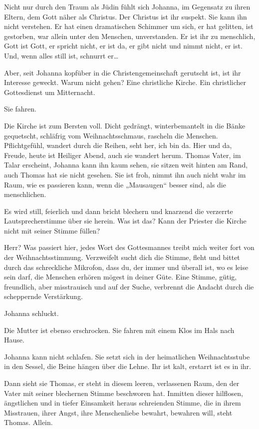 \documentclass[10pt,a5paper]{book}
\begin{document}
Nicht nur durch den Traum als Jüdin fühlt sich Johanna, im Gegensatz zu ihren Eltern, dem Gott näher als Christus. Der Christus ist ihr suspekt. Sie kann ihn nicht verstehen. Er hat einen dramatischen Schimmer um sich, er hat gelitten, ist gestorben, war allein unter den Menschen, unverstanden. Er ist ihr zu menschlich, Gott ist Gott, er spricht nicht, er ist da, er gibt nicht und nimmt nicht, er ist. Und, wenn alles still ist, schnurrt er\dots 

Aber, seit Johanna kopfüber in die Christengemeinschaft gerutscht ist, ist ihr Interesse geweckt. Warum nicht gehen? Eine christliche Kirche. Ein christlicher Gottesdienst um Mitternacht.

Sie fahren.

Die Kirche ist zum Bersten voll. Dicht gedrängt, winterbemantelt in die Bänke gequetscht, schläfrig vom Weihnachtsschmaus, rascheln die Menschen. Pflichtgefühl, wandert durch die Reihen, seht her, ich bin da. Hier und da, Freude, heute ist Heiliger Abend, auch sie wandert herum.
Thomas Vater, im Talar  erscheint, Johanna kann ihn kaum sehen, sie sitzen weit hinten am Rand, auch Thomas hat sie nicht gesehen. Sie ist froh, nimmt ihn auch nicht wahr im Raum, wie es passieren kann, wenn die „Mausaugen“ besser sind, als die menschlichen.

Es wird still, feierlich und dann bricht blechern und knarzend die verzerrte Lautsprecherstimme über sie herein. Was ist das? Kann der Priester die Kirche nicht mit seiner Stimme füllen? 

Herr? Was passiert hier, jedes Wort des Gottesmannes treibt mich weiter fort von der Weihnachtsstimmung. Verzweifelt sucht dich die Stimme, fleht und bittet durch das schreckliche Mikrofon, dass du, der immer und überall  ist, wo es leise sein darf, die Menschen erhören mögest in deiner Güte. Eine Stimme, gütig, freundlich, aber misstrauisch und auf der Suche, verbrennt die Andacht durch die scheppernde Verstärkung.

Johanna schluckt. 

Die Mutter ist ebenso erschrocken. Sie fahren mit einem Klos im Hals nach Hause.

Johanna kann nicht schlafen. Sie setzt sich in der heimatlichen Weihnachtsstube in den Sessel, die Beine hängen über die Lehne. Ihr ist kalt, erstarrt ist es in ihr. 

Dann sieht sie Thomas, er steht in diesem leeren, verlassenen Raum, den der Vater mit seiner blechernen Stimme beschworen hat. Inmitten dieser hilflosen,  ängstlichen und in tiefer Einsamkeit heraus schreienden Stimme, die in ihrem Misstrauen, ihrer Angst, ihre Menschenliebe bewahrt, bewahren will, steht Thomas. Allein. 
\end{document}

